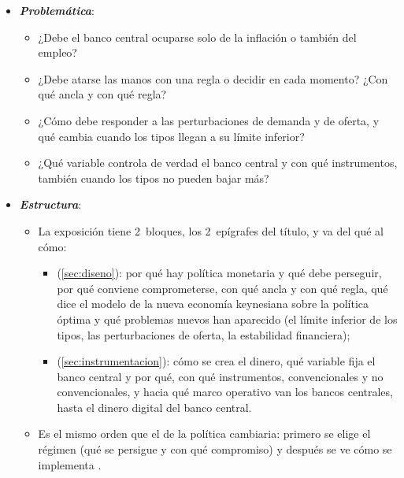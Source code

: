 \documentclass[11pt]{article}
\begin{document}
\begin{itemize}
\begin{itemize}
\begin{itemize}
    \end{itemize}
  \item La historia del diseño es la de cómo se ha gestionado esa tensión: el activismo de los 60, la estanflación de los 70~y la crítica monetarista , las expectativas racionales , los objetivos de inflación desde 1990 con la nueva síntesis , el límite inferior de los tipos y los instrumentos no convencionales desde 2008 y el regreso de la inflación en 2021-2023.
  \end{itemize}

\item \textbf{\emph{Problemática}}:
  \begin{itemize}
  \item ¿Debe el banco central ocuparse solo de la inflación o también del empleo?
  \item ¿Debe atarse las manos con una regla o decidir en cada momento? ¿Con qué ancla y con qué regla?
  \item ¿Cómo debe responder a las perturbaciones de demanda y de oferta, y qué cambia cuando los tipos llegan a su límite inferior?
  \item ¿Qué variable controla de verdad el banco central y con qué instrumentos, también cuando los tipos no pueden bajar más?
  \end{itemize}

\item \textbf{\emph{Estructura}}:
  \begin{itemize}
  \item La exposición tiene 2~bloques, los 2~epígrafes del título, y va del qué al cómo:
  \begin{itemize}
  \item {} (\ref{sec:diseno}): por qué hay política monetaria y qué debe perseguir, por qué conviene comprometerse, con qué ancla y con qué regla, qué dice el modelo de la nueva economía keynesiana sobre la política óptima y qué problemas nuevos han aparecido (el límite inferior de los tipos, las perturbaciones de oferta, la estabilidad financiera);
  \item {} (\ref{sec:instrumentacion}): cómo se crea el dinero, qué variable fija el banco central y por qué, con qué instrumentos, convencionales y no convencionales, y hacia qué marco operativo van los bancos centrales, hasta el dinero digital del banco central.
  \end{itemize}
  \item Es el mismo orden que el de la política cambiaria: primero se elige el régimen (qué se persigue y con qué compromiso) y después se ve cómo se implementa .
  \end{itemize}
\end{itemize}
\end{document}

